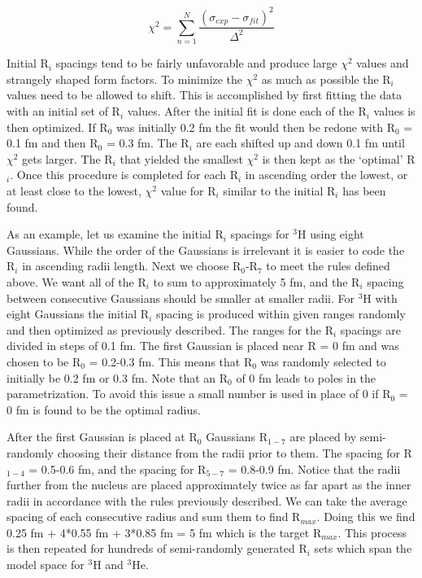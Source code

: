 \begin{equation} \label{eq:chi2}
	\chi^2 = \sum_{n=1}^N \frac{\left( \sigma_{exp}-\sigma_{fit} \right)^2}{\Delta^2}
\end{equation}

Initial R$_i$ spacings tend to be fairly unfavorable and produce large $\chi^2$ values and strangely shaped form factors. To minimize the $\chi^2$ as much as possible the R$_i$ values need to be allowed to shift. This is accomplished by first fitting the data with an initial set of R$_i$ values. After the initial fit is done each of the R$_i$ values is then optimized. If R$_0$ was initially 0.2 fm the fit would then be redone with R$_0$ = 0.1 fm and then R$_0$ = 0.3 fm. The R$_i$ are each shifted up and down 0.1 fm until $\chi^2$ gets larger. The R$_i$ that yielded the smallest $\chi^2$ is then kept as the `optimal' R$_i$. Once this procedure is completed for each R$_i$ in ascending order the lowest, or at least close to the lowest, $\chi^2$ value for R$_i$ similar to the initial R$_i$ has been found.  

As an example, let us examine the initial R$_i$ spacings for $^3$H using eight Gaussians. While the order of the Gaussians is irrelevant it is easier to code the R$_i$ in ascending radii length. Next we choose R$_0$-R$_7$ to meet the rules defined above. We want all of the R$_i$ to sum to approximately 5 fm, and the R$_i$ spacing between consecutive Gaussians should be smaller at smaller radii. For $^3$H with eight Gaussians the initial R$_i$ spacing is produced within given ranges randomly and then optimized as previously described. The ranges for the R$_i$ spacings are divided in steps of 0.1 fm. The first Gaussian is placed near R = 0 fm and was chosen to be R$_0$ = 0.2-0.3 fm. This means that R$_0$ was randomly selected to initially be 0.2 fm or 0.3 fm. Note that an R$_0$ of 0 fm leads to poles in the parametrization. To avoid this issue a small number is used in place of 0 if R$_0$ = 0 fm is found to be the optimal radius. 

After the first Gaussian is placed at R$_0$ Gaussians R$_{1-7}$ are placed by semi-randomly choosing their distance from the radii prior to them. The spacing for R$_{1-4}$ = 0.5-0.6 fm, and the spacing for R$_{5-7}$ = 0.8-0.9 fm. Notice that the radii further from the nucleus are placed approximately twice as far apart as the inner radii in accordance with the rules previously described. We can take the average spacing of each consecutive radius and sum them to find R$_{max}$. Doing this we find 0.25 fm + 4*0.55 fm + 3*0.85 fm = 5 fm which is the target R$_{max}$. This process is then repeated for hundreds of semi-randomly generated R$_i$ sets which span the model space for $^3$H and $^3$He. 

